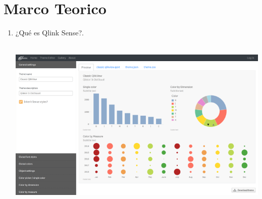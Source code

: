 \section{Marco Teorico} 

\begin{enumerate}[1.]

              \item ¿Qu\'e es Qlink Sense?. \\
               \\
                     \begin{center}
                    \includegraphics[scale=0.60]{./Imagenes/qlik_sense.png}
                    \end{center}
                

\end{enumerate}
